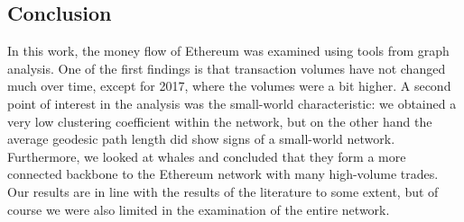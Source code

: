 \documentclass[10pt,a4paper]{article}
\begin{document}
\begin{multicols}{2}

\section{Conclusion}

In this work, the money flow of Ethereum was examined using tools from graph analysis.  
One of the first findings is that  transaction  volumes  have  not changed  much  over  time, except for 2017, where the volumes were a bit higher. A second point of interest in the analysis was the small-world characteristic: we obtained a very low clustering coefficient within the network, but on the other hand the average geodesic path length did show signs of a small-world network. Furthermore, we looked at whales and concluded that they form a more connected backbone to the Ethereum network with many high-volume trades. Our results are in line with the results of the literature to some extent, but of course we were also limited in the examination of the entire network.

\end{multicols}


\end{document}
